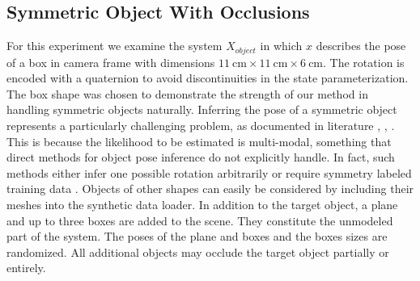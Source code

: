 \documentclass[letterpaper, 10 pt, journal, twoside]{ieeetran}  %
\begin{document}
\subsection{Symmetric Object With Occlusions}
\label{subsec:object_pose_measurement_update}
For this experiment we examine the system $X_{object}$ in which $x$ describes the pose of a box in camera frame with dimensions $\SI{11}{\centi\meter}\times\SI{11}{\centi\meter}\times\SI{6}{\centi\meter}$. The rotation is encoded with a quaternion to avoid discontinuities in the state parameterization.
The box shape was chosen to demonstrate the strength of our method in handling symmetric objects naturally.
Inferring the pose of a symmetric object represents a particularly challenging problem, as documented in literature \cite{pitteriObjectSymmetries6D2019}, \cite{corona2018pose}, \cite{richter2020handling}. This is because the likelihood to be estimated is multi-modal, something that direct methods for object pose inference do not explicitly handle. In fact, such methods either infer one possible rotation arbitrarily \cite{xiang2017posecnn} or require symmetry labeled training data \cite{pitteriObjectSymmetries6D2019}.
Objects of other shapes can easily be considered by including their meshes into the synthetic data loader.
In addition to the target object, a plane and up to three boxes are added to the scene. They constitute the unmodeled part of the system. The poses of the plane and boxes and the boxes sizes are randomized. All additional objects may occlude the target object partially or entirely.
\end{document}
